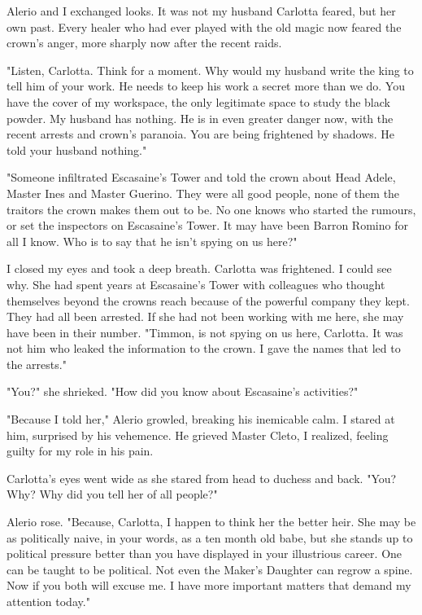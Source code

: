 \documentclass{article}
\begin{document}
Alerio and I exchanged looks. It was not my husband Carlotta feared, but her own past. Every healer who had ever played with the old magic now feared the crown's anger, more sharply now after the recent raids.

"Listen, Carlotta. Think for a moment. Why would my husband write the king to tell him of your work. He needs to keep his work a secret more than we do. You have the cover of my workspace, the only legitimate space to study the black powder. My husband has nothing. He is in even greater danger now, with the recent arrests and crown's paranoia. You are being frightened by shadows. He told your husband nothing."

"Someone infiltrated Escasaine's Tower and told the crown about Head Adele, Master Ines and Master Guerino. They were all good people, none of them the traitors the crown makes them out to be. No one knows who started the rumours, or set the inspectors on Escasaine's Tower. It may have been Barron Romino for all I know. Who is to say that he isn't spying on us here?"

I closed my eyes and took a deep breath. Carlotta was frightened. I could see why. She had spent years at Escasaine's Tower with colleagues who thought themselves beyond the crowns reach because of the powerful company they kept. They had all been arrested. If she had not been working with me here, she may have been in their number. "Timmon, is not spying on us here, Carlotta. It was not him who leaked the information to the crown. I gave the names that led to the arrests."

"You?" she shrieked. "How did you know about Escasaine's activities?"

"Because I told her," Alerio growled, breaking his inemicable calm. I stared at him, surprised by his vehemence. He grieved Master Cleto, I realized, feeling guilty for my role in his pain.

Carlotta's eyes went wide as she stared from head to duchess and back. "You? Why? Why did you tell her of all people?"

Alerio rose. "Because, Carlotta, I happen to think her the better heir. She may be as politically naive, in your words, as a ten month old babe, but she stands up to political pressure better than you have displayed in your illustrious career. One can be taught to be political. Not even the Maker's Daughter can regrow a spine. Now if you both will excuse me. I have more important matters that demand my attention today."
\end{document}
